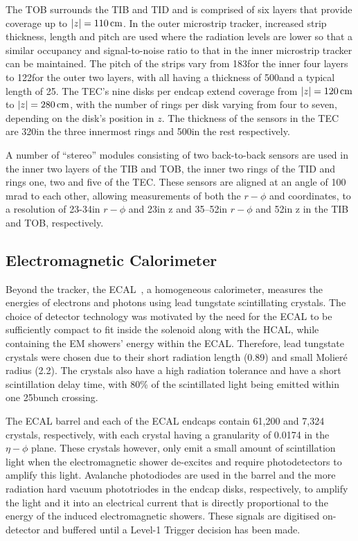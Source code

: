 The TOB surrounds the TIB and TID and is comprised of six layers that provide coverage up to $|z| = 110\,\text{cm}$.
In the outer microstrip tracker, increased strip thickness, length and pitch are used where the radiation levels are lower so that a similar occupancy and signal-to-noise ratio to that in the inner microstrip tracker can be maintained.
The pitch of the strips vary from 183\mum for the inner four layers to 122\mum for the outer two layers, with all having a thickness of 500\mum and a typical length of 25\cm. 
The TEC's nine disks per endcap extend coverage from $|z| = 120\,\text{cm}$ to $|z| = 280\,\text{cm}$, with the number of rings per disk varying from four to seven, depending on the disk's position in $z$.
The thickness of the sensors in the TEC are 320\mum in the three innermost rings and 500\mum in the rest respectively.

A number of ``stereo'' modules consisting of two back-to-back sensors are used in the inner two layers of the TIB and TOB, the inner two rings of the TID and rings one, two and five of the TEC.
These sensors are aligned at an angle of 100 mrad to each other, allowing measurements of both the $r-\phi$ and \rz coordinates, to a resolution of 23-34\mum in $r-\phi$ and 23\mum in z and 35–52\mum in $r-\phi$ and 52\mum in z in the TIB and TOB, respectively.

\subsection{Electromagnetic Calorimeter}\label{subsec:ECAL}
Beyond the tracker, the ECAL~\cite{CMS:1997ysd,CMS:2002xia}, a homogeneous calorimeter, measures the energies of electrons and photons using lead tungstate scintillating crystals.
The choice of detector technology was motivated by the need for the ECAL to be sufficiently compact to fit inside the solenoid along with the HCAL, while containing the EM showers' energy within the ECAL.
Therefore, lead tungstate crystals were chosen due to their short radiation length (0.89\cm) and small Molier\'{e} radius (2.2\cm).
The crystals also have a high radiation tolerance and have a short scintillation delay time, with 80\% of the scintillated light being emitted within one 25\ns bunch crossing.

The ECAL barrel and each of the ECAL endcaps contain 61,200 and 7,324 crystals, respectively, with each crystal having a granularity of 0.0174 in the $\eta - \phi$ plane.
These crystals however, only emit a small amount of scintillation light when the electromagnetic shower de-excites and require photodetectors to amplify this light.
Avalanche photodiodes are used in the barrel and the more radiation hard vacuum phototriodes in the endcap disks, respectively, to amplify the light and it into an electrical current that is directly proportional to the energy of the induced electromagnetic showers.
These signals are digitised on-detector and buffered until a Level-1 Trigger decision has been made.

